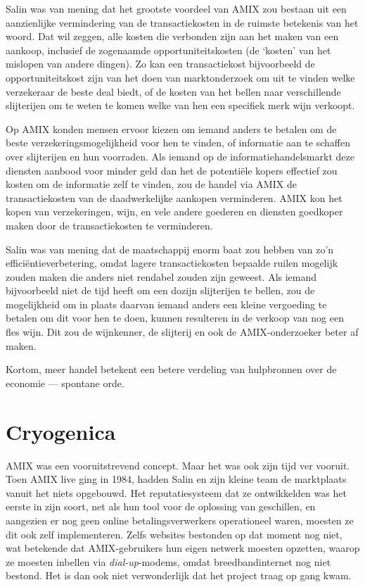 \documentclass[smalldemyvopaper,11pt,twoside,onecolumn,openright,extrafontsizes,hidelinks]{memoir}
\begin{document}
Salin was van mening dat het grootste voordeel van AMIX zou bestaan uit
een aanzienlijke vermindering van de transactiekosten in de ruimste
betekenis van het woord. Dat wil zeggen, alle kosten die verbonden zijn
aan het maken van een aankoop, inclusief de zogenaamde
opportuniteitskosten (de `kosten' van het mislopen van andere dingen).
Zo kan een transactiekost bijvoorbeeld de opportuniteitskost zijn van
het doen van marktonderzoek om uit te vinden welke verzekeraar de beste
deal biedt, of de kosten van het bellen naar verschillende slijterijen
om te weten te komen welke van hen een specifiek merk wijn verkoopt.

Op AMIX konden mensen ervoor kiezen om iemand anders te betalen om de
beste verzekeringsmogelijkheid voor hen te vinden, of informatie aan te
schaffen over slijterijen en hun voorraden. Als iemand op de
informatiehandelsmarkt deze diensten aanbood voor minder geld dan het de
potentiële kopers effectief zou kosten om de informatie zelf te vinden,
zou de handel via AMIX de transactiekosten van de daadwerkelijke
aankopen verminderen. AMIX kon het kopen van verzekeringen, wijn, en
vele andere goederen en diensten goedkoper maken door de
transactiekosten te verminderen.

Salin was van mening dat de maatschappij enorm baat zou hebben van zo'n
efficiëntieverbetering, omdat lagere transactiekosten bepaalde ruilen
mogelijk zouden maken die anders niet rendabel zouden zijn geweest. Als
iemand bijvoorbeeld niet de tijd heeft om een dozijn slijterijen te
bellen, zou de mogelijkheid om in plaats daarvan iemand anders een
kleine vergoeding te betalen om dit voor hen te doen, kunnen resulteren
in de verkoop van nog een fles wijn. Dit zou de wijnkenner, de slijterij
en ook de AMIX-onderzoeker beter af maken.

Kortom, meer handel betekent een betere verdeling van hulpbronnen over
de economie --- spontane orde.

\section{Cryogenica}\label{cryogenica}

AMIX was een vooruitstrevend concept. Maar het was ook zijn tijd ver
vooruit. Toen AMIX live ging in 1984, hadden Salin en zijn kleine team
de marktplaats vanuit het niets opgebouwd. Het reputatiesysteem dat ze
ontwikkelden was het eerste in zijn soort, net als hun tool voor de
oplossing van geschillen, en aangezien er nog geen online
betalingsverwerkers operationeel waren, moesten ze dit ook zelf
implementeren. Zelfs websites bestonden op dat moment nog niet, wat
betekende dat AMIX-gebruikers hun eigen netwerk moesten opzetten, waarop
ze moesten inbellen via \emph{dial-up}-modems, omdat breedbandinternet
nog niet bestond. Het is dan ook niet verwonderlijk dat het project
traag op gang kwam.
\end{document}
